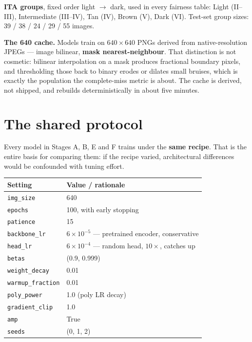 \documentclass[11pt]{article}
\begin{document}
\textbf{ITA groups}, fixed order light $\rightarrow$ dark, used in every fairness
table: Light (II--III), Intermediate (III--IV), Tan (IV), Brown (V), Dark (VI).
Test-set group sizes: 39 / 38 / 24 / 29 / 55 images.

\textbf{The 640 cache.} Models train on $640\times640$ PNGs derived from
native-resolution JPEGs --- image bilinear, \textbf{mask nearest-neighbour}. That
distinction is not cosmetic: bilinear interpolation on a mask produces fractional
boundary pixels, and thresholding those back to binary erodes or dilates small
bruises, which is exactly the population the complete-miss metric is about. The
cache is derived, not shipped, and rebuilds deterministically in about five
minutes.

\section{The shared protocol}

Every model in Stages A, B, E and F trains under the \textbf{same recipe}. That
is the entire basis for comparing them: if the recipe varied, architectural
differences would be confounded with tuning effort.

\begin{center}
\begin{tabular}{lW}
\toprule
\textbf{Setting} & \textbf{Value / rationale} \\
\midrule
\texttt{img\_size} & 640 \\
\texttt{epochs} & 100, with early stopping \\
\texttt{patience} & 15 \\
\texttt{backbone\_lr} & $6\times10^{-5}$ --- pretrained encoder, conservative \\
\texttt{head\_lr} & $6\times10^{-4}$ --- random head, $10\times$, catches up \\
\texttt{betas} & (0.9, 0.999) \\
\texttt{weight\_decay} & 0.01 \\
\texttt{warmup\_fraction} & 0.01 \\
\texttt{poly\_power} & 1.0 (poly LR decay) \\
\texttt{gradient\_clip} & 1.0 \\
\texttt{amp} & True \\
\texttt{seeds} & (0, 1, 2) \\
\bottomrule
\end{tabular}
\end{center}
\end{document}
